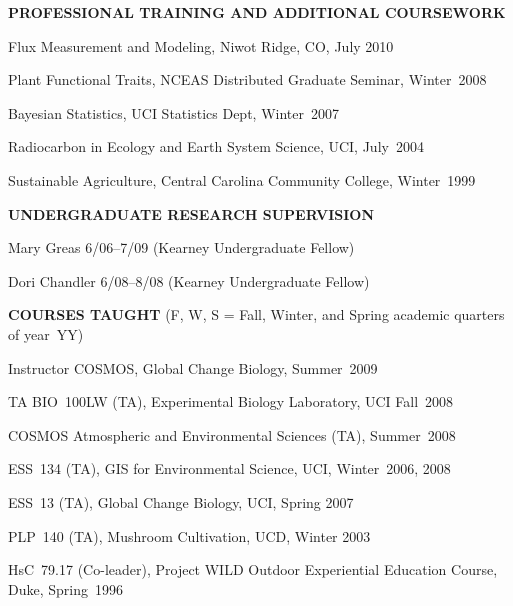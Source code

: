 \documentclass[12pt,twoside]{article}
\begin{document}
{ %

\textbf{PROFESSIONAL TRAINING AND ADDITIONAL COURSEWORK}
\begin{itemize*}
\item Flux Measurement and Modeling, Niwot Ridge, CO, July 2010  
\item Plant Functional Traits, NCEAS Distributed Graduate Seminar, Winter~2008
\item Bayesian Statistics, UCI Statistics Dept, Winter~2007
\item Radiocarbon in Ecology and Earth System Science, UCI, July~2004
\item Sustainable Agriculture, Central Carolina Community College, Winter~1999 
\end{itemize*}


\textbf{UNDERGRADUATE RESEARCH SUPERVISION}
\begin{itemize*}
\renewcommand{\labelenumi}{U\arabic{enumi}.} %
\item Mary Greas 6/06--7/09  (Kearney Undergraduate Fellow) %
\item Dori Chandler 6/08--8/08 (Kearney Undergraduate Fellow)
\end{itemize*}

\textbf{COURSES TAUGHT}
(F, W, S = Fall, Winter, and Spring academic quarters of year~YY)
\begin{itemize*}
\item{Instructor} COSMOS, Global Change Biology, Summer~2009
\item{TA} BIO~100LW (TA), Experimental Biology Laboratory, UCI Fall~2008
\item COSMOS  Atmospheric and Environmental Sciences (TA), Summer~2008
\item ESS~134 (TA), GIS for Environmental Science, UCI, Winter~2006, 2008
\item ESS~13 (TA), Global Change Biology, UCI, Spring 2007
\item PLP~140 (TA), Mushroom Cultivation, UCD, Winter 2003
\item HsC~79.17 (Co-leader), Project WILD Outdoor Experiential Education Course, Duke, Spring~1996
\end{itemize*}

}
\end{document}
